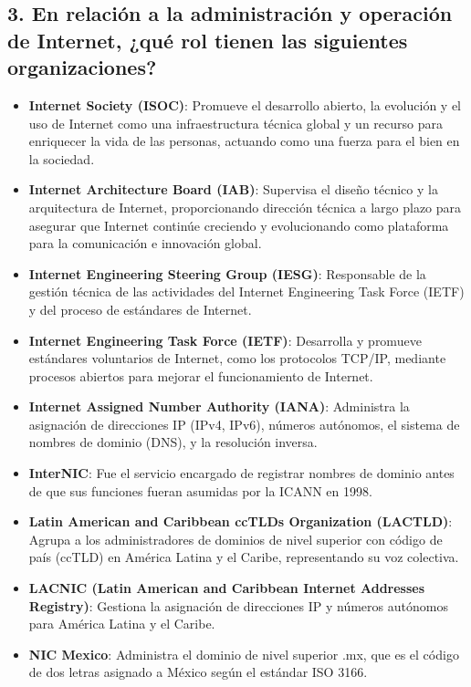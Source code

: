 \documentclass[12pt]{report}
\begin{document}
\subsection*{3. En relación a la administración y operación de Internet, ¿qué rol tienen las siguientes organizaciones?}

\begin{itemize}
	\item \textbf{Internet Society (ISOC)}: Promueve el desarrollo abierto, la evolución y el uso de Internet como una infraestructura técnica global y un recurso para enriquecer la vida de las personas, actuando como una fuerza para el bien en la sociedad.
	\item \textbf{Internet Architecture Board (IAB)}: Supervisa el diseño técnico y la arquitectura de Internet, proporcionando dirección técnica a largo plazo para asegurar que Internet continúe creciendo y evolucionando como plataforma para la comunicación e innovación global.
	\item \textbf{Internet Engineering Steering Group (IESG)}: Responsable de la gestión técnica de las actividades del Internet Engineering Task Force (IETF) y del proceso de estándares de Internet.
	\item \textbf{Internet Engineering Task Force (IETF)}: Desarrolla y promueve estándares voluntarios de Internet, como los protocolos TCP/IP, mediante procesos abiertos para mejorar el funcionamiento de Internet.
	\item \textbf{Internet Assigned Number Authority (IANA)}: Administra la asignación de direcciones IP (IPv4, IPv6), números autónomos, el sistema de nombres de dominio (DNS), y la resolución inversa.
	\item \textbf{InterNIC}: Fue el servicio encargado de registrar nombres de dominio antes de que sus funciones fueran asumidas por la ICANN en 1998.
	\item \textbf{Latin American and Caribbean ccTLDs Organization (LACTLD)}: Agrupa a los administradores de dominios de nivel superior con código de país (ccTLD) en América Latina y el Caribe, representando su voz colectiva.
	\item \textbf{LACNIC (Latin American and Caribbean Internet Addresses Registry)}: Gestiona la asignación de direcciones IP y números autónomos para América Latina y el Caribe.
	\item \textbf{NIC Mexico}: Administra el dominio de nivel superior .mx, que es el código de dos letras asignado a México según el estándar ISO 3166.
\end{itemize}
\end{document}
